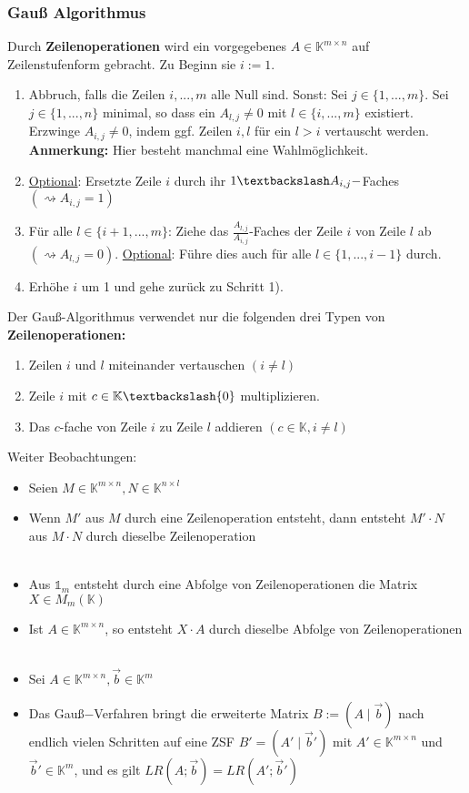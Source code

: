 \documentclass[titlepage]{article}
\newcommand{\K}{\mathbb{K}}
\newcommand{\1}{\mathbb{1}}
\newcommand{\0}{\mathbb{0}}
\begin{document}
				\subsubsection{Gauß Algorithmus}
					Durch \textbf{Zeilenoperationen} wird ein vorgegebenes $A\in\K^{m\times n}$ auf Zeilenstufenform gebracht. Zu Beginn sie $i:=1$.
					\begin{enumerate}
						\item Abbruch, falls die Zeilen $i,...,m$ alle Null sind. Sonst: Sei $j\in\{1,...,m\}$. Sei $j\in\{1,...,n\}$ minimal, so dass ein $A_{l,j}\neq0$ mit $l\in\{i,...,m\}$ existiert. Erzwinge $A_{i,j}\neq0$, indem ggf. Zeilen $i,l$ für ein $l>i$ vertauscht werden. \textbf{Anmerkung:} Hier besteht manchmal eine Wahlmöglichkeit.
						\item \underline{Optional}: Ersetzte Zeile $i$ durch ihr $1\textbackslash A_{i,j}-$Faches $(\rightsquigarrow A_{i,j}=1)$
						\item Für alle $l\in\{i+1,...,m\}$: Ziehe das $\frac{A_{l,j}}{A_{i,j}}$-Faches der Zeile $i$ von Zeile $l$ ab $(\rightsquigarrow A_{l,j}=0)$. \underline{Optional}: Führe dies auch für alle $l\in\{1,...,i-1\}$ durch.
						\item Erhöhe $i$ um 1 und gehe zurück zu Schritt 1).
					\end{enumerate}
					Der Gauß-Algorithmus verwendet nur die folgenden drei Typen von \textbf{Zeilenoperationen:}
					\begin{enumerate}
						\item Zeilen $i$ und $l$ miteinander vertauschen $(i\neq l)$
						\item Zeile $i$ mit $c\in\K\textbackslash\{0\}$ multiplizieren.
						\item Das $c$-fache von Zeile $i$ zu Zeile $l$ addieren $(c\in\K,i\neq l)$
					\end{enumerate}
					Weiter Beobachtungen:
					\begin{itemize}
						\item Seien $M\in\K^{m\times n},N\in\K^{n\times l}$
						\item Wenn $M'$ aus $M$ durch eine Zeilenoperation entsteht, dann entsteht $M'\cdot N$ aus $M\cdot N$ durch dieselbe Zeilenoperation\\\\
						\item Aus $\mathbb{1}_m$ entsteht durch eine Abfolge von Zeilenoperationen die Matrix $X\in M_m(\K)$
						\item Ist $A\in\K^{m\times n}$, so entsteht $X\cdot A$ durch dieselbe Abfolge von Zeilenoperationen\\\\
						\item Sei $A\in\K^{m\times n},\vec{b}\in\K^m$
						\item Das Gauß$-$Verfahren bringt die erweiterte Matrix $B:=(A\mid\vec{b})$ nach endlich vielen Schritten auf eine ZSF $B'=(A'\mid\vec{b}')$ mit $A'\in\K^{m\times n}$ und $\vec{b}'\in\K^m$, und es gilt $LR(A;\vec{b})=LR(A';\vec{b}')$
					\end{itemize}
\end{document}
